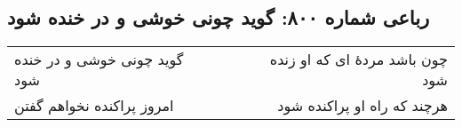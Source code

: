 \begin{center}
\section*{رباعی شماره ۸۰۰: گوید چونی خوشی و در خنده شود}
\label{sec:0800}
\begin{longtable}{l p{0.5cm} r}
گوید چونی خوشی و در خنده شود
&&
چون باشد مردهٔ ای که او زنده شود
\\
امروز پراکنده نخواهم گفتن
&&
هرچند که راه او پراکنده شود
\\
\end{longtable}
\end{center}
